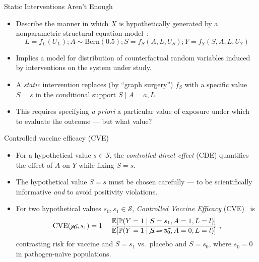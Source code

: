\documentclass{beamer}
\begin{document}

\begin{frame}[c]{Static Interventions Aren't Enough}

\begin{center}
\begin{itemize}
  \itemsep8pt
  \item Describe the manner in which $X$ is hypothetically generated by a
    nonparametric structural equation model~\citep{pearl2009causality}:
    \begin{equation*}
      L = f_L(U_L); A \sim \text{Bern}(0.5);
      S = f_S(A, L, U_S); Y = f_Y(S, A, L, U_Y)
    \end{equation*}
  \item Implies a model for distribution of counterfactual random variables
    induced by interventions on the system under study.
  \item A \textit{static} intervention replaces (by ``graph surgery'') $f_S$
    with a specific value $S=s$ in the conditional support $S \mid A = a, L$.
  \item This requires specifying \textit{a priori} a particular value of
    exposure under which to evaluate the outcome --- but what value?
\end{itemize}
\end{center}

\note{
}

\end{frame}


\begin{frame}[c]{Controlled vaccine efficacy (CVE)}

\begin{center}
\begin{itemize}
  \itemsep8pt
  \item For a hypothetical value $s \in \mathcal{S}$, the \textit{controlled
    direct effect} (CDE) quantifies the effect of $A$ on $Y$ while fixing
    $S = s$.
  \item The hypothetical value $S = s$ must be chosen carefully --- to
    be scientifically informative \textit{and} to avoid positivity violations.
  \item For two hypothetical values $s_0, s_1 \in \mathcal{S}$,
    \textit{Controlled Vaccine Efficacy} (CVE)~\citep{gilbert2022controlled} is
  \begin{equation*}
    \text{CVE}(\cancel{s_0}, s_1) = 1 -
      \frac{\mathbb{E}[\mathbb{P}(Y = 1 \mid S = s_1, A = 1, L = l)]}
      {\mathbb{E}[\mathbb{P}(Y = 1 \mid \cancel{S = s_0}, A = 0, L = l)]} \ ,
  \end{equation*}
  contrasting risk for vaccine and $S = s_1$ vs.~placebo and $S = s_0$, where
  $s_0 = 0$ in pathogen-na\"ive populations.
\end{itemize}
\end{center}

\note{
}

\end{frame}
\end{document}
